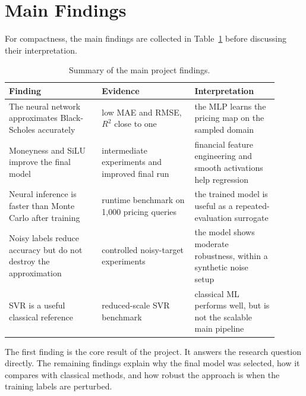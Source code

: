 \section{Main Findings}

For compactness, the main findings are collected in Table~\ref{tab:final-findings} before discussing their interpretation.

\begin{table}[H]
    \centering
    \begin{tabular}{
        >{\raggedright\arraybackslash}p{0.31\linewidth}
        >{\raggedright\arraybackslash}p{0.31\linewidth}
        >{\raggedright\arraybackslash}p{0.28\linewidth}
    }
        \toprule
        Finding & Evidence & Interpretation \\
        \midrule
        The neural network approximates Black-Scholes accurately
        & low MAE and RMSE, $R^2$ close to one
        & the MLP learns the pricing map on the sampled domain \\
        \projecttablerowsep
        Moneyness and SiLU improve the final model
        & intermediate experiments and improved final run
        & financial feature engineering and smooth activations help regression \\
        \projecttablerowsep
        Neural inference is faster than Monte Carlo after training
        & runtime benchmark on 1,000 pricing queries
        & the trained model is useful as a repeated-evaluation surrogate \\
        \projecttablerowsep
        Noisy labels reduce accuracy but do not destroy the approximation
        & controlled noisy-target experiments
        & the model shows moderate robustness, within a synthetic noise setup \\
        \projecttablerowsep
        SVR is a useful classical reference
        & reduced-scale SVR benchmark
        & classical ML performs well, but is not the scalable main pipeline \\
        \bottomrule
    \end{tabular}
    \caption{Summary of the main project findings.}
    \label{tab:final-findings}
\end{table}

The first finding is the core result of the project.
It answers the research question directly.
The remaining findings explain why the final model was selected, how it compares with classical methods, and how robust the approach is when the training labels are perturbed.

